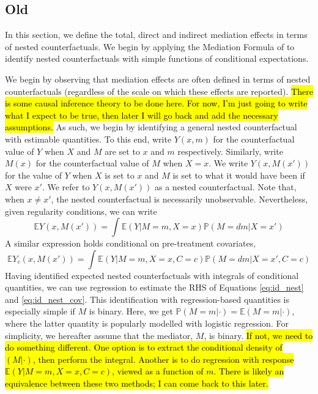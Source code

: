 \documentclass{article}
\newcommand{\bP}{\mathbb{P}}
\newcommand{\bE}{\mathbb{E}}
\begin{document}
\subsection{Old}


In this section, we define the total, direct and indirect mediation effects in terms of nested counterfactuals. We begin by applying the Mediation Formula of \citet{Pea12} to identify nested counterfactuals with simple functions of conditional expectations.

We begin by observing that mediation effects are often defined in terms of nested counterfactuals (regardless of the scale on which these effects are reported). \hl{There is some causal inference theory to be done here. For now, I'm just going to write what I expect to be true, then later I will go back and add the necessary assumptions.} As such, we begin by identifying a general nested counterfactual with estimable quantities. To this end, write $Y(x, m)$ for the counterfactual value of $Y$ when $X$ and $M$ are set to $x$ and $m$ respectively. Similarly, write $M(x)$ for the counterfactual value of $M$ when $X=x$. We write $Y(x, M(x'))$ for the value of $Y$ when $X$ is set to $x$ and $M$ is set to what it would have been if $X$ were $x'$. We refer to $Y(x, M(x'))$ as a nested counterfactual. Note that, when $x \neq x'$, the nested counterfactual is necessarily unobservable. Nevertheless, given regularity conditions, we can write
%
\begin{equation}
    \bE Y(x, M(x')) = \int \bE(Y | M=m, X=x) \bP(M = dm | X = x') \label{eq:id_nest}
\end{equation}
%
A similar expression holds conditional on pre-treatment covariates,
\begin{equation}
    \bE Y_c(x, M(x')) = \int \bE(Y | M=m, X=x, C=c) \bP(M = dm | X = x', C=c) \label{eq:id_nest_cov}
\end{equation}
%
Having identified expected nested counterfactuals with integrals of conditional quantities, we can use regression to estimate the RHS of Equations \ref{eq:id_nest} and \ref{eq:id_nest_cov}. This identification with regression-based quantities is especially simple if $M$ is binary. Here, we get $\bP(M=m | \cdot) = \bE(M=m | \cdot)$, where the latter quantity is popularly modelled with logistic regression. For simplicity, we hereafter assume that the mediator, $M$, is binary. \hl{If not, we need to do something different. One option is to extract the conditional density of $(M | \cdot)$, then perform the integral. Another is to do regression with response $\bE(Y | M=m, X=x, C=c)$, viewed as a function of $m$. There is likely an equivalence between these two methods; I can come back to this later.}
\end{document}
